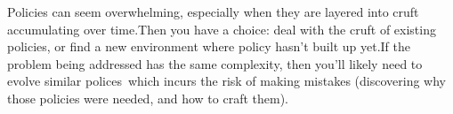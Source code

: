 Policies can seem overwhelming, especially when they are layered into cruft accumulating over time.Then you have a choice: deal with the cruft of existing policies, or find a new environment where policy hasn't built up yet.If the problem being addressed has the same complexity, then you'll likely need to evolve similar polices which incurs the risk of making mistakes (discovering why those policies were needed, and how to craft them).